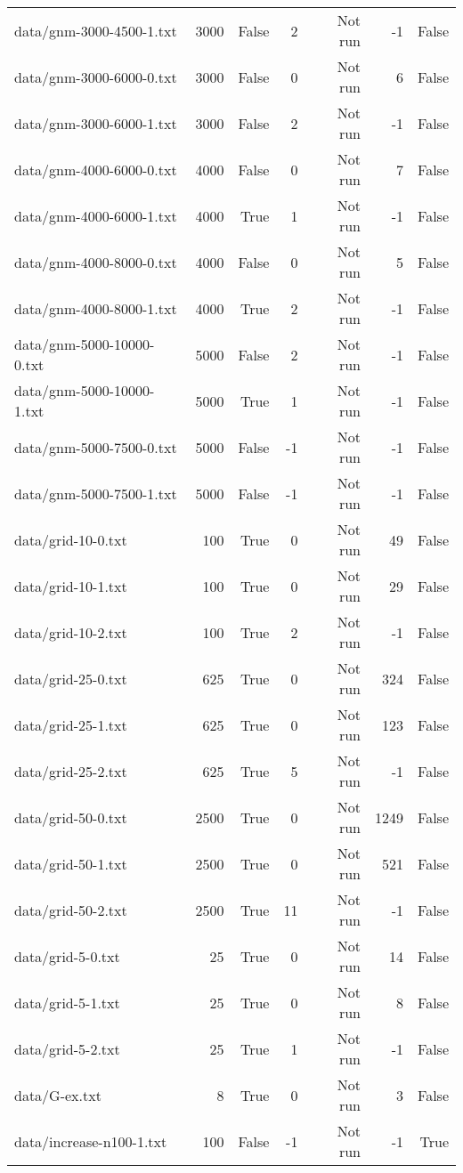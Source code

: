 \begin{tabular}{lrrrrrr}
data/gnm-3000-4500-1.txt & 3000 & False & 2 & Not run & -1 & False \\
data/gnm-3000-6000-0.txt & 3000 & False & 0 & Not run & 6 & False \\
data/gnm-3000-6000-1.txt & 3000 & False & 2 & Not run & -1 & False \\
data/gnm-4000-6000-0.txt & 4000 & False & 0 & Not run & 7 & False \\
data/gnm-4000-6000-1.txt & 4000 & True & 1 & Not run & -1 & False \\
data/gnm-4000-8000-0.txt & 4000 & False & 0 & Not run & 5 & False \\
data/gnm-4000-8000-1.txt & 4000 & True & 2 & Not run & -1 & False \\
data/gnm-5000-10000-0.txt & 5000 & False & 2 & Not run & -1 & False \\
data/gnm-5000-10000-1.txt & 5000 & True & 1 & Not run & -1 & False \\
data/gnm-5000-7500-0.txt & 5000 & False & -1 & Not run & -1 & False \\
data/gnm-5000-7500-1.txt & 5000 & False & -1 & Not run & -1 & False \\
data/grid-10-0.txt & 100 & True & 0 & Not run & 49 & False \\
data/grid-10-1.txt & 100 & True & 0 & Not run & 29 & False \\
data/grid-10-2.txt & 100 & True & 2 & Not run & -1 & False \\
data/grid-25-0.txt & 625 & True & 0 & Not run & 324 & False \\
data/grid-25-1.txt & 625 & True & 0 & Not run & 123 & False \\
data/grid-25-2.txt & 625 & True & 5 & Not run & -1 & False \\
data/grid-50-0.txt & 2500 & True & 0 & Not run & 1249 & False \\
data/grid-50-1.txt & 2500 & True & 0 & Not run & 521 & False \\
data/grid-50-2.txt & 2500 & True & 11 & Not run & -1 & False \\
data/grid-5-0.txt & 25 & True & 0 & Not run & 14 & False \\
data/grid-5-1.txt & 25 & True & 0 & Not run & 8 & False \\
data/grid-5-2.txt & 25 & True & 1 & Not run & -1 & False \\
data/G-ex.txt & 8 & True & 0 & Not run & 3 & False \\
data/increase-n100-1.txt & 100 & False & -1 & Not run & -1 & True \\

\end{tabular}
